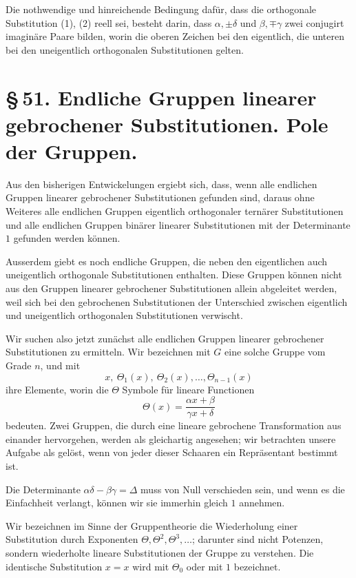 \documentclass[11pt]{article}
\begin{document}
Die nothwendige und hinreichende Bedingung dafür, dass die orthogonale Substitution (1), (2) reell sei, besteht darin, dass $\alpha,\pm\delta$ und $\beta,\mp\gamma$ zwei conjugirt imaginäre Paare bilden, worin die oberen Zeichen bei den eigentlich, die unteren bei den uneigentlich orthogonalen Substitutionen gelten.

\section*{\S\,51. Endliche Gruppen linearer gebrochener Substitutionen. Pole der Gruppen.}

Aus den bisherigen Entwickelungen ergiebt sich, dass, wenn alle endlichen Gruppen linearer gebrochener Substitutionen gefunden sind, daraus ohne Weiteres alle endlichen Gruppen eigentlich orthogonaler ternärer Substitutionen und alle endlichen Gruppen binärer linearer Substitutionen mit der Determinante $1$ gefunden werden können.

Ausserdem giebt es noch endliche Gruppen, die neben den eigentlichen auch uneigentlich orthogonale Substitutionen enthalten. Diese Gruppen können nicht aus den Gruppen linearer gebrochener Substitutionen allein abgeleitet werden, weil sich bei den gebrochenen Substitutionen der Unterschied zwischen eigentlich und uneigentlich orthogonalen Substitutionen verwischt.

Wir suchen also jetzt zunächst alle endlichen Gruppen linearer gebrochener Substitutionen zu ermitteln. Wir bezeichnen mit $G$ eine solche Gruppe vom Grade $n$, und mit
\begin{equation}
x,\ \Theta_1(x),\ \Theta_2(x),\ldots,\Theta_{n-1}(x)
\tag{1}
\end{equation}
ihre Elemente, worin die $\Theta$ Symbole für lineare Functionen
\begin{equation}
\Theta(x)=\frac{\alpha x+\beta}{\gamma x+\delta}
\tag{2}
\end{equation}
bedeuten. Zwei Gruppen, die durch eine lineare gebrochene Transformation aus einander hervorgehen, werden als gleichartig angesehen; wir betrachten unsere Aufgabe als gelöst, wenn von jeder dieser Schaaren ein Repräsentant bestimmt ist.

Die Determinante $\alpha\delta-\beta\gamma=\Delta$ muss von Null verschieden sein, und wenn es die Einfachheit verlangt, können wir sie immerhin gleich $1$ annehmen.

Wir bezeichnen im Sinne der Gruppentheorie die Wiederholung einer Substitution durch Exponenten $\Theta,\Theta^2,\Theta^3,\ldots$; darunter sind nicht Potenzen, sondern wiederholte lineare Substitutionen der Gruppe zu verstehen. Die identische Substitution $x=x$ wird mit $\Theta_0$ oder mit $1$ bezeichnet.
\end{document}
